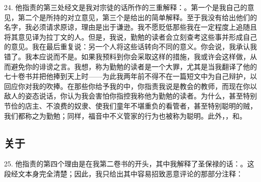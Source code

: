 24. 他指责的第三处经文是我对宗徒的话所作的三重解释：。第一个是我自己的意见，第二个是所持的对立意见，第三个是给出的简单解释。至于我没有给出他们的名字，我必须请求原谅，理由是出于谦逊。我不愿贬低那些我在一定程度上追随且将其意见译为拉丁文的人。但是，我说，勤勉的读者会立刻查考这些事并形成自己的意见。我在最后重复说：另一个人将这些话转向不同的意义。你会说，我承认我错了。我本应说而不是。如果我预料到你会采取这样的措施，我或许会这样做，从而避免你的诽谤之言。我想，称为勤勉的读者是一个大罪，尤其是当我翻译了他的七十卷书并把他捧到天上时——为此我两年前不得不在一篇短文中为自己辩护，以回应你对我的吹捧。在那些你给予我的中，你指责我说是教会的教师，而现在你以敌人的姿态说话，你认为我会害怕你指控我称他为勤勉的读者。为什么，甚至特别节俭的店主、不浪费的奴隶、使我们童年不堪重负的看管者，甚至特别聪明的贼，我们都称之为勤勉；同样，福音中不义管家的行为也被称为聪明。此外，，和。\par


\subsection{关于}

25. 他指责的第四个理由是在我第二卷书的开头，其中我解释了圣保禄的话：。这段经文本身完全清楚；因此，我只给出其中容易招致恶意评论的那部分注释：\par

\par

